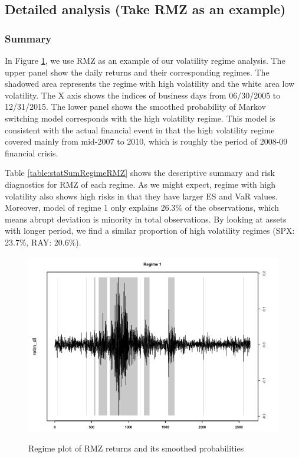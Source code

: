 \documentclass[12pt]{article}
\begin{document}
\subsection{Detailed analysis (Take RMZ as an example)}

\subsubsection{Summary}

In Figure \ref{fig: RMZregime}, we use RMZ as an example of our volatility regime analysis. The upper panel show the daily returns and their corresponding regimes. The shadowed area represents the regime with high volatility and the white area low volatility. The X axis shows the indices of business days from 06/30/2005 to 12/31/2015. The lower panel shows the smoothed probability of Markov switching model corresponds with the high volatility regime. This model is consistent with the actual financial event in that the high volatility regime covered mainly from mid-2007 to 2010, which is roughly the period of 2008-09 financial crisis.

Table \ref{table:statSumRegimeRMZ} shows the descriptive summary and risk diagnostics for RMZ of each regime. As we might expect, regime with high volatility also shows high risks in that they have larger ES and VaR values. Moreover, model of regime 1 only explains 26.3\% of the observations, which means abrupt deviation is minority in total observations. By looking at assets with longer period, we find a similar proportion of high volatility regimes (SPX: 23.7\%, RAY: 20.6\%).


\begin{figure}[h]
\caption{Regime plot of RMZ returns and its smoothed probabilities} 
\centering 
\includegraphics[width=1\textwidth]{../results/regime/RMZ}
\label{fig: RMZregime}
\end{figure}
\end{document}
